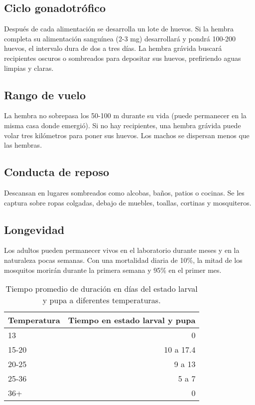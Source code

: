 \subsection{Ciclo gonadotrófico}
Después de cada alimentación se desarrolla un lote de huevos. Si la hembra completa su alimentación sanguínea (2-3 mg) desarrollará y pondrá 100-200 huevos, el intervalo dura de dos a tres días. La hembra grávida buscará recipientes oscuros o sombreados para depositar sus huevos, prefiriendo aguas limpias y claras.\\

\subsection{Rango de vuelo}
La hembra no sobrepasa los 50-100 m durante su vida (puede permanecer en la misma casa donde emergió). Si no hay recipientes, una hembra grávida puede volar tres kilómetros para poner sus huevos. Los machos se dispersan menos que las hembras.\\

\subsection{Conducta de reposo}
Descansan en lugares sombreados como alcobas, baños, patios o cocinas. Se les captura sobre ropas colgadas, debajo de muebles, toallas, cortinas y mosquiteros.\\

\subsection{Longevidad}
Los adultos pueden permanecer vivos en el laboratorio durante meses y en la naturaleza pocas semanas. Con una mortalidad diaria de 10\%, la mitad de los mosquitos morirán durante la primera semana y 95\% en el primer mes.\\


\begin{table}
\centering
\begin{tabular}{l|r}
Temperatura & Tiempo en estado larval y pupa \\\hline
13 & 0 \\
15-20 & 10 a 17.4 \\
20-25 & 9 a 13 \\
25-36 & 5 a 7 \\
36+ & 0
\end{tabular}
\caption{\label{tab:widgets}Tiempo promedio de duración en días del estado larval y pupa a diferentes temperaturas.}
\end{table}
